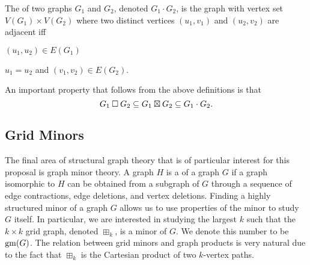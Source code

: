 \documentclass[../main.tex]{subfiles}
\begin{document}
The  of two graphs $G_1$ and $G_2$, denoted $G_1 \cdot G_2$, is the graph with vertex set $V(G_1) \times V(G_2)$ where two distinct vertices $(u_1, v_1)$ and $(u_2, v_2)$ are adjacent iff
\begin{compactitem}
	\item $(u_1, u_2) \in E(G_1)$
	\item $u_1 = u_2$ and $(v_1, v_2) \in E(G_2)$.
\end{compactitem}

An important property that follows from the above definitions is that $$G_1\mathbin{\Box} G_2 \subseteq G_1\boxtimes G_2 \subseteq G_1 \cdot G_2.$$


\subsection{Grid Minors}
The final area of structural graph theory that is of particular interest for this proposal is graph minor theory. A graph $H$ is a  of a graph $G$ if a graph isomorphic to $H$ can be obtained from a subgraph of $G$ through a sequence of edge contractions, edge deletions, and vertex deletions. Finding a highly structured minor of a graph $G$ allows us to use properties of the minor to study $G$ itself. In particular, we are interested in studying the largest $k$ such that the $k\times k$ grid graph, denoted $\boxplus_k$, is a minor of $G$. We denote this number to be $\operatorname{gm}(G)$. The relation between grid minors and graph products is very natural due to the fact that $\boxplus_k$ is the Cartesian product of two $k$-vertex paths.

	
	
\end{document}
